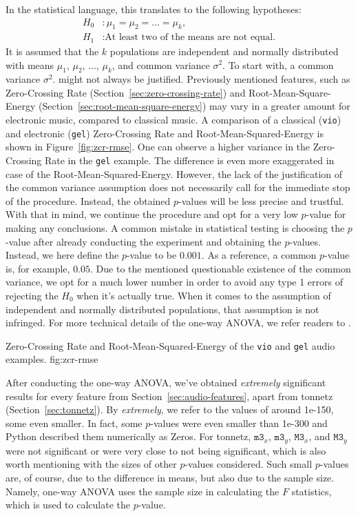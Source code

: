 In the statistical language, this translates to the following hypotheses:
\begin{equation*}
\begin{aligned}
H_0&: \mu_1 = \mu_2 = \dots = \mu_k, \\
H_1&: \text{At least two of the means are not equal.}
\end{aligned}
\end{equation*}
It is assumed that the $k$ populations are independent and normally distributed
with means $\mu_1$, $\mu_2$, $\dots$, $\mu_k$, and common variance $\sigma^2$.
To start with, a common variance $\sigma^2$. might not always be justified. Previously mentioned features, such as Zero-Crossing Rate (Section~\ref{sec:zero-crossing-rate}) and Root-Mean-Square-Energy (Section~\ref{sec:root-mean-square-energy}) may vary in a greater amount for electronic music, compared to classical music. A comparison of a classical (\texttt{vio}) and electronic (\texttt{gel}) Zero-Crossing Rate and Root-Mean-Squared-Energy is shown in Figure~\ref{fig:zcr-rmse}. One can observe a higher variance in the Zero-Crossing Rate in the \texttt{gel} example. The difference is even more exaggerated in case of the Root-Mean-Squared-Energy. However, the lack of the justification of the common variance assumption does not necessarily call for the immediate stop of the procedure. Instead, the obtained $p$-values will be less precise and trustful. With that in mind, we continue the procedure and opt for a very low $p$-value for making any conclusions. A common mistake in statistical testing is choosing the $p$-value after already conducting the experiment and obtaining the $p$-values. Instead, we here define the $p$-value to be $0.001$. As a reference, a common $p$-value is, for example, $0.05$. Due to the mentioned questionable existence of the common variance, we opt for a much lower number in order to avoid any type 1 errors of rejecting the $H_0$ when it's actually true.
When it comes to the assumption of independent and normally distributed populations, that assumption is not infringed. For more technical details of the one-way ANOVA, we refer readers to \cite{walpole1993probability}.

	        {Zero-Crossing Rate and Root-Mean-Squared-Energy of the \texttt{vio} and \texttt{gel} audio examples.}
                {fig:zcr-rmse}

After conducting the one-way ANOVA, we've obtained \textit{extremely} significant results for every feature from Section~\ref{sec:audio-features}, apart from tonnetz (Section~\ref{sec:tonnetz}). By \textit{extremely}, we refer to the values of around 1e-150, some even smaller. In fact, some $p$-values were even smaller than 1e-300 and Python described them numerically as Zeros. For tonnetz, $\texttt{m3}_x$, $\texttt{m3}_y$, $\texttt{M3}_x$, and $\texttt{M3}_y$ were not significant or were very close to not being significant, which is also worth mentioning with the sizes of other $p$-values considered. Such small $p$-values are, of course, due to the difference in means, but also due to the sample size. Namely, one-way ANOVA uses the sample size in calculating the $F$ statistics, which is used to calculate the $p$-value.

